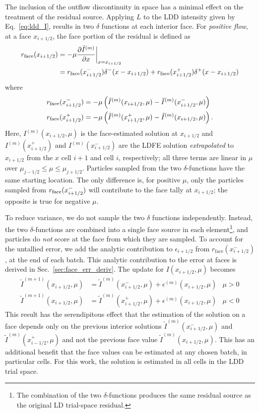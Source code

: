 The inclusion of the outflow discontinuity in space has a minimal effect on the treatment of the
residual source.
Applying $L$ to the LDD intensity given by Eq.~\eqref{eq:ldd_I}, results in two $\delta$ functions at each interior face.
For \emph{positive flow}, at a face $x_{i+1/2}$, the face portion of the residual is defined as
\begin{align}
    \label{eq:res_face}
    r_{\text{face}}(x_{i+1/2}) &= -\mu \frac{\partial \tilde I^{(m)}}{\partial x}\bigg|_{x=x_{i+1/2}}\\
    &= r_{\text{face}}(x_{i+1/2}^-)\delta^-(x - x_{i+1/2}) + r_{\text{face}}(x_{i+1/2}^+)\delta^+(x - x_{i+1/2}) 
\end{align}
where
\begin{align}
    r_{\text{face}}(x_{i+1/2}^-) &= -\mu\left( \tilde I^{(m)}(x_{i+1/2},\mu) - \tilde I^{(m)}(x_{i+1/2}^-,\mu)
           \right)\\
    r_{\text{face}}(x_{i+1/2}^+) &= -\mu\left( \tilde I^{(m)}(x_{i+1/2}^+,\mu) -
           \tilde I^{(m)}(x_{i+1/2},\mu)
           \right).
\end{align}
Here, $I^{(m)}(x_{i+1/2},\mu)$ is the face-estimated solution at $x_{i+1/2}$ and
$I^{(m)}(x_{i+1/2}^+)$ and $I^{(m)}(x_{i+1/2}^-)$ are the LDFE solution
\emph{extrapolated} to $x_{i+1/2}$ from the $x$ cell $i+1$ and cell $i$, respectively; all
three terms are linear in
$\mu$ over $\mu_{j-1/2} \leq \mu \leq \mu_{j+1/2}$.  Particles sampled from the
two $\delta$-functions have the same starting location.  The only difference is, for
positive $\mu$, only the particles sampled from $r_{\text{face}}(x^-_{i+1/2})$ will contribute to the face
tally at $x_{i+1/2}$; the opposite is true for negative $\mu$.  

To reduce variance, we do not sample the two $\delta$ functions independently.
Instead, the
two $\delta$-functions are combined into a single face source in each element\footnote{The combination of the two $\delta$-functions produces the same residual source as the
original LD trial-space residual.},
and particles do \emph{not} score at the face from which they are sampled.  To account for the
untallied error, we add the analytic
contribution to $\epsilon_{i+1/2}$ from $r_{\text{face}}(x_{i+1/2}^-)$, at the end of
each batch.  This analytic contribution to the error at faces is derived in Sec.~\ref{sec:face_err_deriv}. 
The update for $I(x_{i+1/2},\mu)$ becomes
\begin{align}
   \tilde I^{(m+1)}(x_{i+1/2},\mu)  &= \tilde I^{(m)}(x_{i+1/2}^-,\mu) +
   \epsilon^{(m)}(x_{i+1/2},\mu) & \mu > 0 \\
   \tilde I^{(m+1)}(x_{i+1/2},\mu)  &= \tilde I^{(m)}(x_{i+1/2}^+,\mu) +
   \epsilon^{(m)}(x_{i+1/2},\mu) & \mu < 0
\end{align}
This result has the serendipitous effect that the estimation of the solution on a face depends only on
the previous interior solutions $\tilde I^{(m)}(x_{i+1/2}^-,\mu)$ and $\tilde
I^{(m)}(x_{i-1/2}^+,\mu)$ and not the previous face value 
$\tilde I^{(m)}(x_{i+1/2},\mu)$. This has an additional benefit that the face values can
be estimated at any chosen batch, in particular cells.  For this work, the solution is
estimated in all cells in the LDD trial space.


